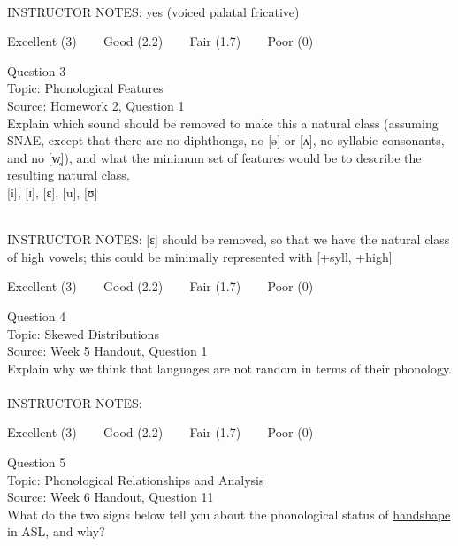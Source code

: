 \documentclass[12pt]{article}
\begin{document}
~\\
INSTRUCTOR NOTES: yes (voiced palatal fricative)


\vfill
Excellent (3) ~~~ Good (2.2) ~~~ Fair (1.7) ~~~ Poor (0)
\newpage

{\large Question 3}\\

Topic: Phonological Features\\
Source: Homework 2, Question 1\\

Explain which sound should be removed to make this a natural class (assuming SNAE, except that there are no diphthongs, no [ə] or [ʌ], no syllabic consonants, and no [w̥]), and what the minimum set of features would be to describe the resulting natural class.\\

{[i]}, {[ɪ]}, {[ɛ]}, {[u]}, {[ʊ]}


~\\
INSTRUCTOR NOTES: [ɛ] should be removed, so that we have the natural class of high vowels; this could be minimally represented with [+syll, +high]


\vfill
Excellent (3) ~~~ Good (2.2) ~~~ Fair (1.7) ~~~ Poor (0)
\newpage

{\large Question 4}\\

Topic: Skewed Distributions\\
Source: Week 5 Handout, Question 1\\

Explain why we think that languages are not random in terms of their phonology.\\


~\\
INSTRUCTOR NOTES: 


\vfill
Excellent (3) ~~~ Good (2.2) ~~~ Fair (1.7) ~~~ Poor (0)
\newpage

{\large Question 5}\\

Topic: Phonological Relationships and Analysis\\
Source: Week 6 Handout, Question 11\\

What do the two signs below tell you about the phonological status of \underline{handshape} in ASL, and why?\\
\end{document}
